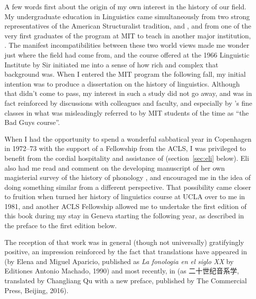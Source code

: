\addchap{\lsPrefaceTitle}
 
A few words first about the origin of my own interest in the history
of our field. My undergraduate education in Linguistics came
simultaneously from two strong representatives of the American
Structuralist tradition,  and , and from
one of the very first graduates of the program at MIT to teach in
another major institution, . The manifest
incompatibilities between these two world views made me wonder just
where the field had come from, and the course offered at the 1966
{Linguistic Institute} by Sir  initiated me into a sense of
how rich and complex that background was. When I entered the MIT
program the following fall, my initial intention was to produce a
dissertation on the history of linguistics. Although that didn't come
to pass, my interest in such a study did not go away, and was in fact
reinforced by discussions with colleagues and faculty, and especially
by 's fine classes in what was misleadingly referred to
by MIT students of the time as ``the Bad Guys course''.

When I had the opportunity to spend a wonderful sabbatical year in
Copenhagen in 1972--73 with the support of a Fellowship from the ACLS,
I was privileged to benefit from the cordial hospitality and
assistance of  (section~\ref{sec:eli}
below). Eli also had me read and comment on the developing
manu\-script of her own magisterial survey of the history of phonology
\citep{fischer-jorgensen75:trends}, and encouraged me in the idea of
doing something similar from a different perspective. That possibility
came closer to fruition when  turned her history of
linguistics course at UCLA over to me in 1981, and another ACLS
Fellowship allowed me to undertake the first edition of this book
during my stay in Geneva starting the following year, as described in
the preface to the first edition below.

The reception of that work was in general (though not universally)
gratifyingly positive, an impression reinforced by the fact that
translations have appeared in  (by Elena and Miguel Aparicio,
published as \textsl{La fonologia en el siglo XX} by Editiones Antonio
Machado, 1990) and most recently, in  (as 二十世纪音系学,
translated
by Changliang Qu with a new preface, published by The Commercial
Press, Beijing, 2016).

